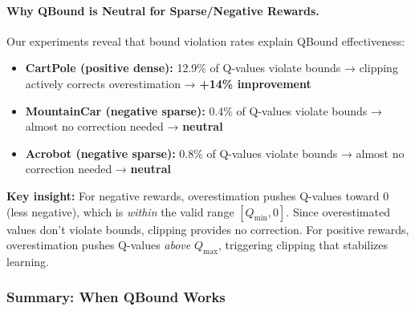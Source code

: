 \documentclass[11pt]{article}
\theoremstyle{definition}
\theoremstyle{remark}
\begin{document}
\paragraph{Why QBound is Neutral for Sparse/Negative Rewards.} Our experiments reveal that bound violation rates explain QBound effectiveness:
\begin{itemize}
    \item \textbf{CartPole (positive dense):} 12.9\% of Q-values violate bounds → clipping actively corrects overestimation → \textbf{+14\% improvement}
    \item \textbf{MountainCar (negative sparse):} 0.4\% of Q-values violate bounds → almost no correction needed → \textbf{neutral}
    \item \textbf{Acrobot (negative sparse):} 0.8\% of Q-values violate bounds → almost no correction needed → \textbf{neutral}
\end{itemize}

\textbf{Key insight:} For negative rewards, overestimation pushes Q-values toward 0 (less negative), which is \textit{within} the valid range $[Q_{\min}, 0]$. Since overestimated values don't violate bounds, clipping provides no correction. For positive rewards, overestimation pushes Q-values \textit{above} $Q_{\max}$, triggering clipping that stabilizes learning.

\subsubsection{Summary: When QBound Works}
\end{document}
